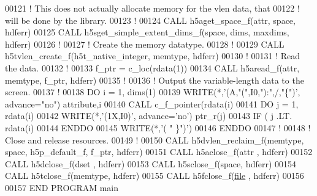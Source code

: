 \begin{DoxyCode}
00121   \textcolor{comment}{! This does not actually allocate memory for the vlen data, that}
00122   \textcolor{comment}{! will be done by the library.}
00123   \textcolor{comment}{!}
00124   \textcolor{keyword}{CALL }h5aget\_space\_f(attr, space, hdferr)
00125   \textcolor{keyword}{CALL }h5sget\_simple\_extent\_dims\_f(space, dims, maxdims, hdferr)
00126   \textcolor{comment}{!}
00127   \textcolor{comment}{! Create the memory datatype.}
00128   \textcolor{comment}{!}
00129   \textcolor{keyword}{CALL }h5tvlen\_create\_f(h5t\_native\_integer, memtype, hdferr)
00130   \textcolor{comment}{!}
00131   \textcolor{comment}{! Read the data.}
00132   \textcolor{comment}{!}
00133   f\_ptr = c\_loc(rdata(1))
00134   \textcolor{keyword}{CALL }h5aread\_f(attr, memtype, f\_ptr, hdferr)
00135   \textcolor{comment}{!}
00136   \textcolor{comment}{! Output the variable-length data to the screen.}
00137   \textcolor{comment}{!}
00138   \textcolor{keywordflow}{DO} i = 1, dims(1)
00139      \textcolor{keyword}{WRITE}(*,\textcolor{stringliteral}{'(A,"(",I0,"):",/,"\{")'}, advance=\textcolor{stringliteral}{"no"}) attribute,i
00140      \textcolor{keyword}{CALL }c\_f\_pointer(rdata(i)%
00141      \textcolor{keywordflow}{DO} j = 1, rdata(i)%
00142         \textcolor{keyword}{WRITE}(*,\textcolor{stringliteral}{'(1X,I0)'}, advance=\textcolor{stringliteral}{'no'}) ptr\_r(j)
00143         \textcolor{keywordflow}{IF} ( j .LT. rdata(i)%
00144 \textcolor{keywordflow}{     ENDDO}
00145      \textcolor{keyword}{WRITE}(*,\textcolor{stringliteral}{'( " \}")'})
00146 \textcolor{keywordflow}{  ENDDO}
00147   \textcolor{comment}{!}
00148   \textcolor{comment}{! Close and release resources.}
00149   \textcolor{comment}{!}
00150   \textcolor{keyword}{CALL }h5dvlen\_reclaim\_f(memtype, space, h5p\_default\_f, f\_ptr, hdferr)
00151   \textcolor{keyword}{CALL }h5aclose\_f(attr , hdferr)
00152   \textcolor{keyword}{CALL }h5dclose\_f(dset , hdferr)
00153   \textcolor{keyword}{CALL }h5sclose\_f(space, hdferr)
00154   \textcolor{keyword}{CALL }h5tclose\_f(memtype, hdferr)
00155   \textcolor{keyword}{CALL }h5fclose\_f(\hyperlink{structfile}{file} , hdferr)
00156 
00157 \textcolor{keyword}{END PROGRAM }main
\end{DoxyCode}
